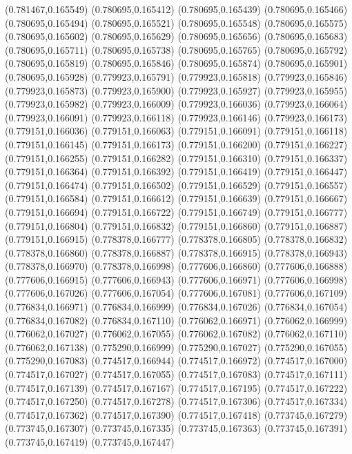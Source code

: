 (0.781467,0.165549)
(0.780695,0.165412)
(0.780695,0.165439)
(0.780695,0.165466)
(0.780695,0.165494)
(0.780695,0.165521)
(0.780695,0.165548)
(0.780695,0.165575)
(0.780695,0.165602)
(0.780695,0.165629)
(0.780695,0.165656)
(0.780695,0.165683)
(0.780695,0.165711)
(0.780695,0.165738)
(0.780695,0.165765)
(0.780695,0.165792)
(0.780695,0.165819)
(0.780695,0.165846)
(0.780695,0.165874)
(0.780695,0.165901)
(0.780695,0.165928)
(0.779923,0.165791)
(0.779923,0.165818)
(0.779923,0.165846)
(0.779923,0.165873)
(0.779923,0.165900)
(0.779923,0.165927)
(0.779923,0.165955)
(0.779923,0.165982)
(0.779923,0.166009)
(0.779923,0.166036)
(0.779923,0.166064)
(0.779923,0.166091)
(0.779923,0.166118)
(0.779923,0.166146)
(0.779923,0.166173)
(0.779151,0.166036)
(0.779151,0.166063)
(0.779151,0.166091)
(0.779151,0.166118)
(0.779151,0.166145)
(0.779151,0.166173)
(0.779151,0.166200)
(0.779151,0.166227)
(0.779151,0.166255)
(0.779151,0.166282)
(0.779151,0.166310)
(0.779151,0.166337)
(0.779151,0.166364)
(0.779151,0.166392)
(0.779151,0.166419)
(0.779151,0.166447)
(0.779151,0.166474)
(0.779151,0.166502)
(0.779151,0.166529)
(0.779151,0.166557)
(0.779151,0.166584)
(0.779151,0.166612)
(0.779151,0.166639)
(0.779151,0.166667)
(0.779151,0.166694)
(0.779151,0.166722)
(0.779151,0.166749)
(0.779151,0.166777)
(0.779151,0.166804)
(0.779151,0.166832)
(0.779151,0.166860)
(0.779151,0.166887)
(0.779151,0.166915)
(0.778378,0.166777)
(0.778378,0.166805)
(0.778378,0.166832)
(0.778378,0.166860)
(0.778378,0.166887)
(0.778378,0.166915)
(0.778378,0.166943)
(0.778378,0.166970)
(0.778378,0.166998)
(0.777606,0.166860)
(0.777606,0.166888)
(0.777606,0.166915)
(0.777606,0.166943)
(0.777606,0.166971)
(0.777606,0.166998)
(0.777606,0.167026)
(0.777606,0.167054)
(0.777606,0.167081)
(0.777606,0.167109)
(0.776834,0.166971)
(0.776834,0.166999)
(0.776834,0.167026)
(0.776834,0.167054)
(0.776834,0.167082)
(0.776834,0.167110)
(0.776062,0.166971)
(0.776062,0.166999)
(0.776062,0.167027)
(0.776062,0.167055)
(0.776062,0.167082)
(0.776062,0.167110)
(0.776062,0.167138)
(0.775290,0.166999)
(0.775290,0.167027)
(0.775290,0.167055)
(0.775290,0.167083)
(0.774517,0.166944)
(0.774517,0.166972)
(0.774517,0.167000)
(0.774517,0.167027)
(0.774517,0.167055)
(0.774517,0.167083)
(0.774517,0.167111)
(0.774517,0.167139)
(0.774517,0.167167)
(0.774517,0.167195)
(0.774517,0.167222)
(0.774517,0.167250)
(0.774517,0.167278)
(0.774517,0.167306)
(0.774517,0.167334)
(0.774517,0.167362)
(0.774517,0.167390)
(0.774517,0.167418)
(0.773745,0.167279)
(0.773745,0.167307)
(0.773745,0.167335)
(0.773745,0.167363)
(0.773745,0.167391)
(0.773745,0.167419)
(0.773745,0.167447)
